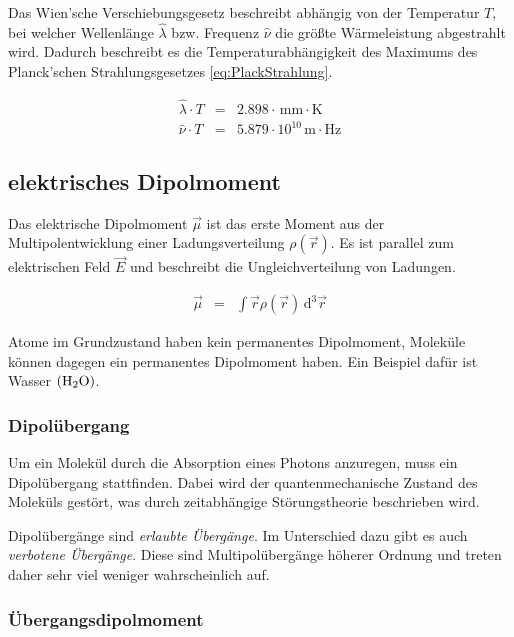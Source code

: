 \documentclass[12pt,a4paper]{scrartcl}
\numberwithin{equation}{section} %
\begin{document}
Das Wien'sche Verschiebungsgesetz beschreibt abhängig von der Temperatur $T$, bei welcher Wellenlänge $\hat{\lambda}$ bzw. Frequenz $\hat{\nu}$ die größte Wärmeleistung abgestrahlt wird. Dadurch beschreibt es die Temperaturabhängigkeit des Maximums des Planck'schen Strahlungsgesetzes \eqref{eq:PlackStrahlung}.

\begin{eqnarray}
  \hat{\lambda}\cdot T &=& 2.898 \cdot \mathrm{\,mm\cdot K}
  \label{eq:WienLambda}\\
  \hat{\nu}\cdot T &=& 5.879\cdot10^{10} \mathrm{\,m\cdot Hz}
  \label{eq:WienNu}
\end{eqnarray}

\hypertarget{elektrisches-dipolmoment}{%
\subsection{elektrisches Dipolmoment}\label{elektrisches-dipolmoment}}

Das elektrische Dipolmoment $\vec \mu$ ist das erste Moment aus der Multipolentwicklung einer Ladungsverteilung $\rho(\vec r)$. \cite{Dipolmoment} Es ist parallel zum elektrischen Feld $\vec E$ und beschreibt die Ungleichverteilung von Ladungen.

\begin{eqnarray}
  \vec \mu &=& \int \vec r \rho(\vec r) \,\mathrm d^3\vec r
\end{eqnarray}

\noindent
Atome im Grundzustand haben kein permanentes Dipolmoment, Moleküle können dagegen ein permanentes Dipolmoment haben. Ein Beispiel dafür ist Wasser $(\ce{H_2O})$.

\hypertarget{dipoluxfcbergang}{%
\subsubsection{Dipolübergang}\label{dipoluxfcbergang}}

Um ein Molekül durch die Absorption eines Photons anzuregen, muss ein Dipolübergang stattfinden. Dabei wird der quantenmechanische Zustand des Moleküls gestört, was durch zeitabhängige Störungstheorie beschrieben wird. \cite{Hinderer}

Dipolübergänge sind \emph{erlaubte Übergänge}. Im Unterschied dazu gibt es auch \emph{verbotene Übergänge}. Diese sind Multipolübergänge höherer Ordnung und treten daher sehr viel weniger wahrscheinlich auf.

\hypertarget{uxfcbergangsdipolmoment}{\subsubsection{Übergangsdipolmoment}\label{uxfcbergangsdipolmoment}}
\end{document}
